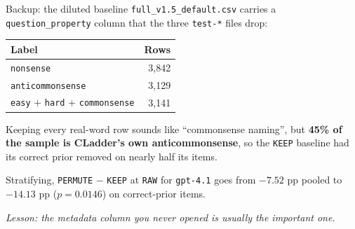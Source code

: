 \documentclass{beamer}
\begin{document}
\begin{frame}{Backup: the diluted baseline}
  \texttt{full\_v1.5\_default.csv} carries a \texttt{question\_property} column
  that the three \texttt{test-*} files drop:

  \begin{center}
  \begin{tabular}{lr}
    \toprule
    Label & Rows \\
    \midrule
    \texttt{nonsense}        & 3{,}842 \\
    \texttt{anticommonsense} & 3{,}129 \\
    \texttt{easy} + \texttt{hard} + \texttt{commonsense} & 3{,}141 \\
    \bottomrule
  \end{tabular}
  \end{center}

  \vspace{0.1cm}
  Keeping every real-word row sounds like ``commonsense naming'', but
  \textbf{45\% of the sample is CLadder's own anticommonsense}, so the
  \texttt{KEEP} baseline had its correct prior removed on nearly half its items.

  \vspace{0.1cm}
  Stratifying, \texttt{PERMUTE} $-$ \texttt{KEEP} at \texttt{RAW} for
  \texttt{gpt-4.1} goes from $-7.52$ pp pooled to $\mathbf{-14.13}$ pp
  ($p = 0.0146$) on correct-prior items.

  \vspace{0.1cm}
  \emph{Lesson: the metadata column you never opened is usually the important one.}
\end{frame}
\end{document}
